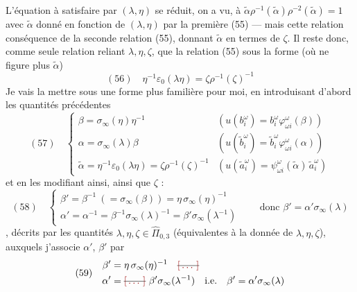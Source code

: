 \documentclass[11pt,a4paper]{article}
\begin{document}
L'équation à satisfaire par $(\lambda, \eta)$ se réduit, on a vu, à $\tilde\alpha \rho^{-1}(\tilde\alpha) \rho^{-2}(\tilde\alpha) = 1$ avec $\tilde\alpha$ donné en fonction de $(\lambda, \eta)$ par la première   (55) — mais cette relation   conséquence de la seconde relation (55), donnant $\tilde\alpha$ en termes de $\zeta$. Il reste donc, comme seule relation reliant $\lambda, \eta, \zeta$, que la relation (55) sous la forme (où ne figure plus $\tilde\alpha$)
\[
(56)\quad \eta^{-1} \varepsilon_0(\lambda\eta) = \zeta \rho^{-1}(\zeta)^{-1}
\]
Je vais la mettre sous une forme plus familière pour moi, en introduisant d'abord les quantités précédentes
\[
(57)\quad
\begin{cases}
\beta = \sigma_\infty(\eta)\eta^{-1} & (u(b_i^{\omega}) = b_i^{\omega} \varphi^{\omega}_{\omega i}(\beta)) \\
\alpha = \sigma_\infty(\lambda)\beta & (u(\tilde b_i^{\omega}) = \tilde b_i^{\omega} \varphi^{\omega}_{\omega i}(\alpha)) \\
\tilde\alpha = \eta^{-1}\varepsilon_0(\lambda\eta) = \zeta\rho^{-1}(\zeta)^{-1} & (u(\tilde a_i^{\omega}) = \psi^{\omega}_{\omega i}(\tilde\alpha)\, \tilde a_i^{\omega})
\end{cases}
\]
et en les modifiant ainsi, ainsi que $\zeta$ :
\[
(58)\quad
\begin{cases}
\beta' = \beta^{-1} \ (= \sigma_\infty(\beta)) = \eta\, \sigma_\infty(\eta)^{-1} \\
\alpha' = \alpha^{-1} = \beta^{-1} \sigma_\infty(\lambda)^{-1} = \beta' \sigma_\infty(\lambda^{-1})
\end{cases}
\qquad \text{donc } \beta' = \alpha' \sigma_\infty(\lambda)
\]
 , \struck{\ill{}}  décrits par les quantités $\boxed{\lambda, \eta, \zeta} \in \widehat{\Pi}_{0,3}$ (équivalentes à la donnée de $\lambda, \eta, \zeta$), auxquels j'associe $\alpha'$, $\beta'$ par
\[
(59)\quad
\begin{aligned}
\beta' &= \eta\, \sigma_\infty(\eta)^{-1} \quad \text{\struck{\ill{}}} \\
\alpha' &= \text{\struck{\ill{}}}\ \beta' \sigma_\infty(\lambda^{-1}) \quad \text{i.e.} \quad \beta' = \alpha' \sigma_\infty(\lambda)
\end{aligned}
\]
\end{document}
